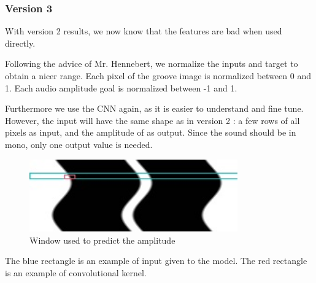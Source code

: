 \documentclass[12pt, twoside]{article}
\begin{document}
\subsubsection{Version 3}
With version 2 results, we now know that the features are bad when used directly.

Following the advice of Mr. Hennebert, we normalize the inputs and target to obtain a nicer range. Each pixel of the groove image is normalized between 0 and 1. Each audio amplitude goal is normalized between -1 and 1.

Furthermore we use the CNN again, as it is easier to understand and fine tune. However, the input will have the same shape as in version 2 : a few rows of all pixels as input, and the amplitude of as output. Since the sound should be in mono, only one output value is needed.

\begin{figure}
	\centering
	\includegraphics[width=0.8\textwidth]{../images/input.jpg}
	\caption{Window used to predict the amplitude}
	\label{input_v3}
\end{figure}

The blue rectangle is an example of input given to the model. The red rectangle is an example of convolutional kernel.
\end{document}
